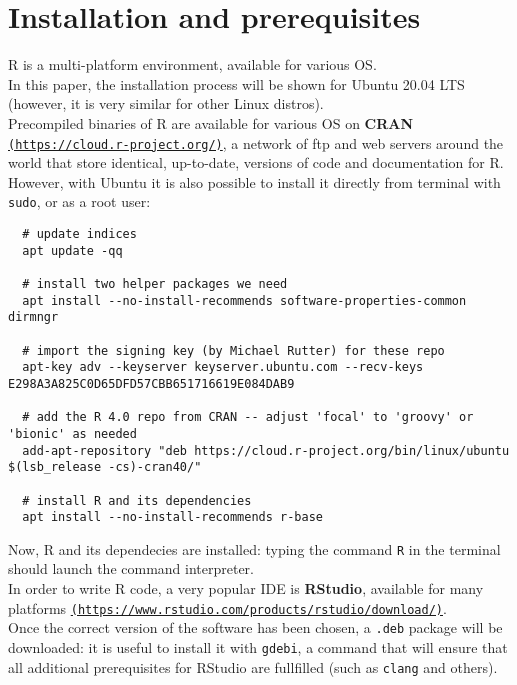 \documentclass{article}
\begin{document}
\pagebreak

\section{Installation and prerequisites}
R is a multi-platform environment, available for various OS.\\
In this paper, the installation process will be shown for Ubuntu 20.04 LTS\\
(however, it is very similar for other Linux distros).\\

Precompiled binaries of R are available for various OS on \textbf{CRAN} \href{https://cloud.r-project.org/}{\texttt{(https://cloud.r-project.org/)}}, a network of ftp and web servers around the world that store identical, up-to-date, versions of code and documentation for R.\\

However, with Ubuntu it is also possible to install it directly from terminal with \texttt{sudo}, or as a root user:\\

\begin{lstlisting}
  # update indices
  apt update -qq

  # install two helper packages we need
  apt install --no-install-recommends software-properties-common dirmngr

  # import the signing key (by Michael Rutter) for these repo
  apt-key adv --keyserver keyserver.ubuntu.com --recv-keys E298A3A825C0D65DFD57CBB651716619E084DAB9

  # add the R 4.0 repo from CRAN -- adjust 'focal' to 'groovy' or 'bionic' as needed
  add-apt-repository "deb https://cloud.r-project.org/bin/linux/ubuntu $(lsb_release -cs)-cran40/"

  # install R and its dependencies
  apt install --no-install-recommends r-base
\end{lstlisting}

Now, R and its dependecies are installed: typing the command \texttt{R} in the terminal should launch the command interpreter.\\

In order to write R code, a very popular IDE is \textbf{RStudio}, available for many platforms \href{https://www.rstudio.com/products/rstudio/download/}{\texttt{(https://www.rstudio.com/products/rstudio/download/)}}.
\\

Once the correct version of the software has been chosen, a \texttt{.deb} package will be downloaded: it is useful to install it with \texttt{gdebi}, a command that will ensure that all additional prerequisites for RStudio are fullfilled (such as \texttt{clang} and others).\\
\end{document}

